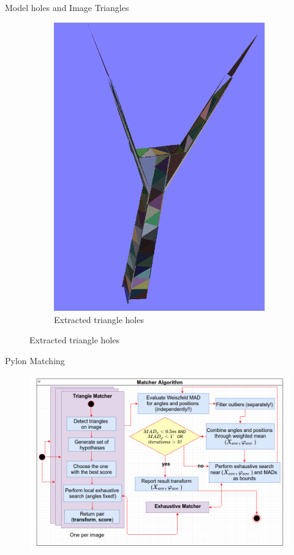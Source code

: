 \documentclass{beamer}
\begin{document}
\begin{frame}[t, fragile]{Model holes and Image Triangles}
\begin{figure}
\begin{subfigure}{.5\textwidth}
\includegraphics[scale=0.2]{colored_3d_triangles}
\caption{Extracted triangle holes}
\end{subfigure}
\end{figure}
\end{frame}


\begin{frame}[t, fragile]{Pylon Matching}

\begin{figure}
\centering
\includegraphics[scale=0.3]{Match}
\end{figure}
 

\end{frame}
\end{document}
